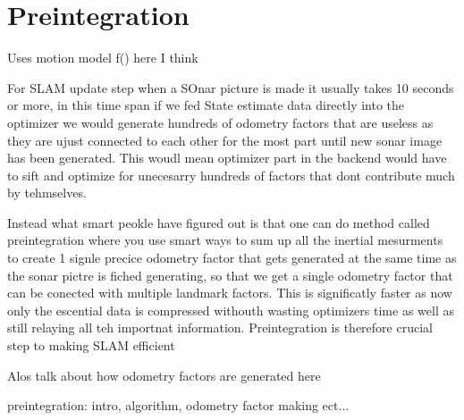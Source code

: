 \section{Preintegration}

Uses motion model f() here I think

For SLAM update step when a SOnar picture is made it usually takes 10 seconds or more, in this time span if we fed State estimate data directly into the optimizer we would generate hundreds of odometry factors that are useless as they are ujust connected to each other for the most part until new sonar image has been generated. This woudl mean optimizer part in the backend would have to sift and optimize for unecesarry hundreds of factors that dont contribute much by tehmselves.

Instead what smart peokle have figured out is that one can do method called preintegration where you use smart ways to sum up all the inertial mesurments to create 1 signle precice odometry factor that gets generated at the same time as the sonar pictre is fiched generating, so that we get a single odometry factor that can be conected with multiple landmark factors. This is significatly faster as now only the escential data is compressed withouth wasting optimizers time as well as still relaying all teh importnat information. Preintegration is therefore crucial step to making SLAM efficient

Alos talk about how odometry factors are generated here

preintegration: intro, algorithm, odometry factor making ect...


